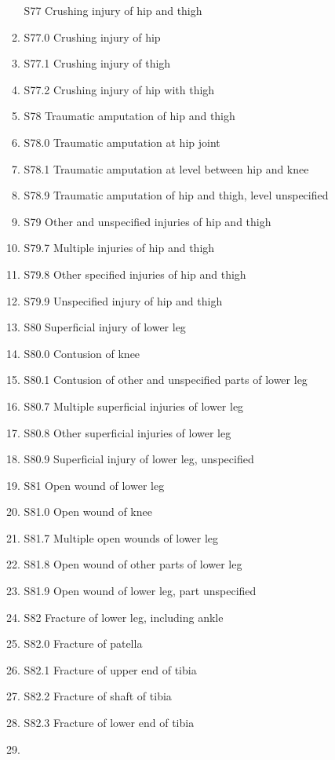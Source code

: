 \documentclass[
]{scrartcl}
\begin{document}
\begin{itemize}
\begin{enumerate}
    S77 Crushing injury of hip and thigh
  \item
    S77.0 Crushing injury of hip
  \item
    S77.1 Crushing injury of thigh
  \item
    S77.2 Crushing injury of hip with thigh
  \item
    S78 Traumatic amputation of hip and thigh
  \item
    S78.0 Traumatic amputation at hip joint
  \item
    S78.1 Traumatic amputation at level between hip and knee
  \item
    S78.9 Traumatic amputation of hip and thigh, level unspecified
  \item
    S79 Other and unspecified injuries of hip and thigh
  \item
    S79.7 Multiple injuries of hip and thigh
  \item
    S79.8 Other specified injuries of hip and thigh
  \item
    S79.9 Unspecified injury of hip and thigh
  \item
    S80 Superficial injury of lower leg
  \item
    S80.0 Contusion of knee
  \item
    S80.1 Contusion of other and unspecified parts of lower leg
  \item
    S80.7 Multiple superficial injuries of lower leg
  \item
    S80.8 Other superficial injuries of lower leg
  \item
    S80.9 Superficial injury of lower leg, unspecified
  \item
    S81 Open wound of lower leg
  \item
    S81.0 Open wound of knee
  \item
    S81.7 Multiple open wounds of lower leg
  \item
    S81.8 Open wound of other parts of lower leg
  \item
    S81.9 Open wound of lower leg, part unspecified
  \item
    S82 Fracture of lower leg, including ankle
  \item
    S82.0 Fracture of patella
  \item
    S82.1 Fracture of upper end of tibia
  \item
    S82.2 Fracture of shaft of tibia
  \item
    S82.3 Fracture of lower end of tibia
  \item

\end{enumerate}
\end{itemize}
\end{document}

